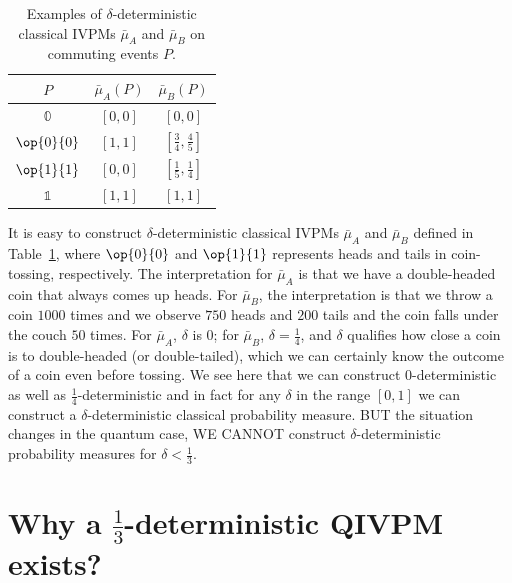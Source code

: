 \documentclass[english,reprint, aps, prl,superscriptaddress, showpacs,
showkeys, longbibliography, amsmath, amssymb, floatfix]{revtex4-1}
\theoremstyle{plain}
\theoremstyle{definition}
\newcommand{\imposs}{\ensuremath{\left[0,0\right]}}
\newcommand{\necess}{\ensuremath{\left[1,1\right]}}
\newcommand{\proj}[1]{\op{#1}{#1}}
\begin{document}
\begin{table}
\noindent \centering{}\caption{\label{tab:classical-IVPMs}Examples of $\delta$-deterministic classical
IVPMs $\bar{\mu}_{A}$ and $\bar{\mu}_{B}$ on commuting events $P$.}
\begin{tabular}{ccc}
\toprule 
\addlinespace
$P$  & $\bar{\mu}_{A}(P)$  & $\bar{\mu}_{B}(P)$ \tabularnewline
\midrule
\midrule 
\addlinespace
$\mathbb{0}$  & $\imposs$  & $\imposs$ \tabularnewline
\midrule 
\addlinespace
$\proj{0}$  & $\necess$  & $\left[\frac{3}{4},\frac{4}{5}\right]$ \tabularnewline
\midrule 
\addlinespace
$\proj{1}$  & $\imposs$  & $\left[\frac{1}{5},\frac{1}{4}\right]$ \tabularnewline
\midrule 
\addlinespace
$\mathbb{1}$  & $\necess$  & $\necess$ \tabularnewline
\bottomrule
\end{tabular}
\end{table}

\noindent It is easy to construct $\delta$-deterministic classical
IVPMs $\bar{\mu}_{A}$ and $\bar{\mu}_{B}$ defined in Table~\ref{tab:classical-IVPMs},
where $\proj{0}$ and $\proj{1}$ represents heads and tails in coin-tossing,
respectively. The interpretation for $\bar{\mu}_{A}$ is that we have
a double-headed coin that always comes up heads. For $\bar{\mu}_{B}$,
the interpretation is that we throw a coin $1000$ times and we observe
$750$ heads and $200$ tails and the coin falls under the couch $50$
times. For $\bar{\mu}_{A}$, $\delta$ is $0$; for $\bar{\mu}_{B}$,
$\delta=\frac{1}{4}$, and $\delta$ qualifies how close a coin is
to double-headed (or double-tailed), which we can certainly know the
outcome of a coin even before tossing. We see here that we can construct
$0$-deterministic as well as $\frac{1}{4}$-deterministic and in
fact for any $\delta$ in the range $\left[0,1\right]$ we can construct
a $\delta$-deterministic classical probability measure. BUT the situation
changes in the quantum case, WE CANNOT construct $\delta$-deterministic
probability measures for $\delta<\frac{1}{3}$.

\section{Why a \texorpdfstring{$\frac{1}{3}$}{⅓}-deterministic QIVPM exists?}
\end{document}
